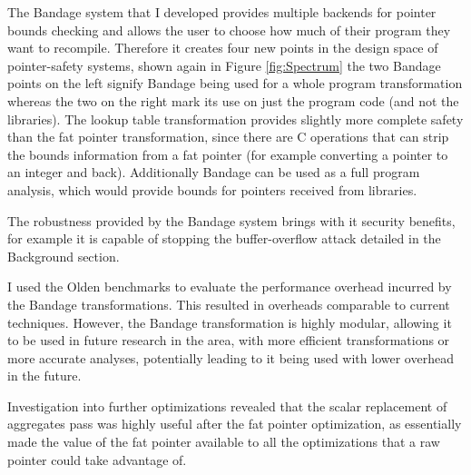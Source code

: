 The Bandage system that I developed provides multiple backends for pointer bounds checking and allows the user to choose how much of their program they want to recompile.
Therefore it creates four new points in the design space of pointer-safety systems, shown again in Figure \ref{fig:Spectrum} the two Bandage points on the left signify Bandage being used for a whole program transformation whereas the two on the right mark its use on just the program code (and not the libraries).
The lookup table transformation provides slightly more complete safety than the fat pointer transformation, since there are C operations that can strip the bounds information from a fat pointer (for example converting a pointer to an integer and back).
Additionally Bandage can be used as a full program analysis, which would provide bounds for pointers received from libraries.




The robustness provided by the Bandage system brings with it security benefits, for example it is capable of stopping the buffer-overflow attack detailed in the Background section.

I used the Olden benchmarks to evaluate the performance overhead incurred by the Bandage transformations.
This resulted in overheads comparable to current techniques.
However, the Bandage transformation is highly modular, allowing it to be used in future research in the area, with more efficient transformations or more accurate analyses, potentially leading to it being used with lower overhead in the future.

Investigation into further optimizations revealed that the scalar replacement of aggregates pass was highly useful after the fat pointer optimization, as essentially made the value of the fat pointer available to all the optimizations that a raw pointer could take advantage of.
